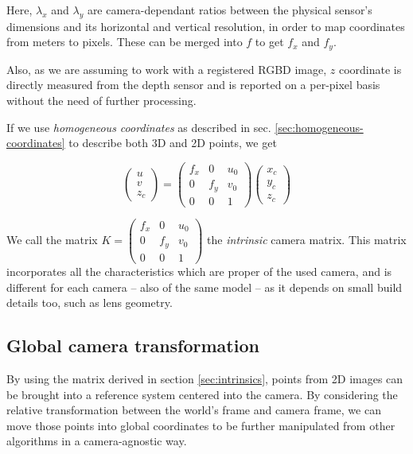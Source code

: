 Here, $\lambda _x$ and $\lambda _y$ are camera-dependant ratios between the
physical sensor's dimensions and its horizontal and vertical resolution, in
order to map coordinates from meters to pixels. These can be merged into $f$ to
get $f_x$ and $f_y$.

Also, as we are assuming to work with a registered RGBD image, $z$ coordinate is
directly measured from the depth sensor and is reported on a per-pixel basis
without the need of further processing.

If we use \emph{homogeneous coordinates} as described in sec.
\ref{sec:homogeneous-coordinates}
to describe both 3D and 2D points, we get

\begin{equation} \label{eqn:intrinsics}
\left(\begin{array}{c}u\\v\\z_c\end{array}\right)
  =
  \left(\begin{array}{cccc}
      f_x & 0 & u_0 \\
      0 & f_y & v_0 \\
      0 & 0   & 1 
  \end{array}\right)
\left(\begin{array}{c}x_c\\y_c\\z_c\end{array}\right)
\end{equation}

We call the matrix 
$K=
  \left(\begin{array}{cccc}
      f_x & 0 & u_0 \\
      0 & f_y & v_0 \\
      0 & 0   & 1 
\end{array}\right)$
the \emph{intrinsic} camera matrix. This matrix incorporates all the
characteristics which are proper of the used camera, and is different for each
camera -- also of the same model -- as it depends on small build details too,
such as lens geometry.

\subsection{Global camera transformation}
By using the matrix derived in section \ref{sec:intrinsics}, points from 2D
images can be brought into a reference system centered into the camera.
By considering the relative transformation between the world's frame and camera
frame, we can move those points into global coordinates to be further
manipulated from other algorithms in a camera-agnostic way.

